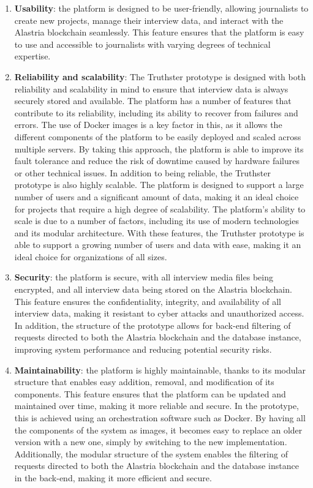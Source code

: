 \documentclass[target=mst,aauheader=]{thud}
\begin{document}
    \begin{enumerate}

        \item \textbf{Usability}: the platform is designed to be user-friendly, allowing journalists to create new projects, manage their interview data, and interact with the Alastria blockchain seamlessly. This feature ensures that the platform is easy to use and accessible to journalists with varying degrees of technical expertise.
        \item \textbf{Reliability and scalability}: The Truthster prototype is designed with both reliability and scalability in mind to ensure that interview data is always securely stored and available. The platform has a number of features that contribute to its reliability, including its ability to recover from failures and errors. The use of Docker images is a key factor in this, as it allows the different components of the platform to be easily deployed and scaled across multiple servers. By taking this approach, the platform is able to improve its fault tolerance and reduce the risk of downtime caused by hardware failures or other technical issues. In addition to being reliable, the Truthster prototype is also highly scalable. The platform is designed to support a large number of users and a significant amount of data, making it an ideal choice for projects that require a high degree of scalability. The platform's ability to scale is due to a number of factors, including its use of modern technologies and its modular architecture. With these features, the Truthster prototype is able to support a growing number of users and data with ease, making it an ideal choice for organizations of all sizes.
        \item \textbf{Security}: the platform is secure, with all interview media files being encrypted, and all interview data being stored on the Alastria blockchain. This feature ensures the confidentiality, integrity, and availability of all interview data, making it resistant to cyber attacks and unauthorized access. In addition, the structure of the prototype allows for back-end filtering of requests directed to both the Alastria blockchain and the database instance, improving system performance and reducing potential security risks.
        \item \textbf{Maintainability}: the platform is highly maintainable, thanks to its modular structure that enables easy addition, removal, and modification of its components. This feature ensures that the platform can be updated and maintained over time, making it more reliable and secure. In the prototype, this is achieved using an orchestration software such as Docker. By having all the components of the system as images, it becomes easy to replace an older version with a new one, simply by switching to the new implementation. Additionally, the modular structure of the system enables the filtering of requests directed to both the Alastria blockchain and the database instance in the back-end, making it more efficient and secure.

\end{enumerate}
\end{document}
